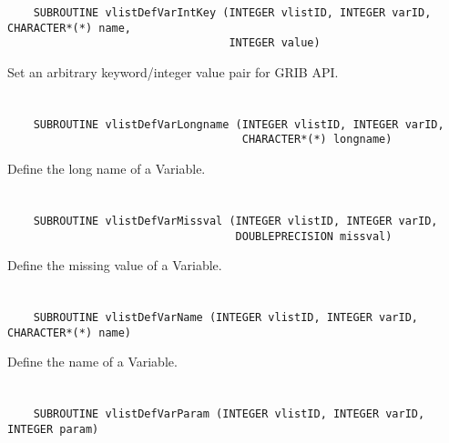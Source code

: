 \begin{verbatim}
    SUBROUTINE vlistDefVarIntKey (INTEGER vlistID, INTEGER varID, CHARACTER*(*) name,
                                  INTEGER value)
\end{verbatim}

Set an arbitrary keyword/integer value pair for GRIB API.


\section*{\tt {}}

\begin{verbatim}
    SUBROUTINE vlistDefVarLongname (INTEGER vlistID, INTEGER varID,
                                    CHARACTER*(*) longname)
\end{verbatim}

Define the long name of a Variable.


\section*{\tt {}}

\begin{verbatim}
    SUBROUTINE vlistDefVarMissval (INTEGER vlistID, INTEGER varID,
                                   DOUBLEPRECISION missval)
\end{verbatim}

Define the missing value of a Variable.


\section*{\tt {}}

\begin{verbatim}
    SUBROUTINE vlistDefVarName (INTEGER vlistID, INTEGER varID, CHARACTER*(*) name)
\end{verbatim}

Define the name of a Variable.


\section*{\tt {}}

\begin{verbatim}
    SUBROUTINE vlistDefVarParam (INTEGER vlistID, INTEGER varID, INTEGER param)
\end{verbatim}

